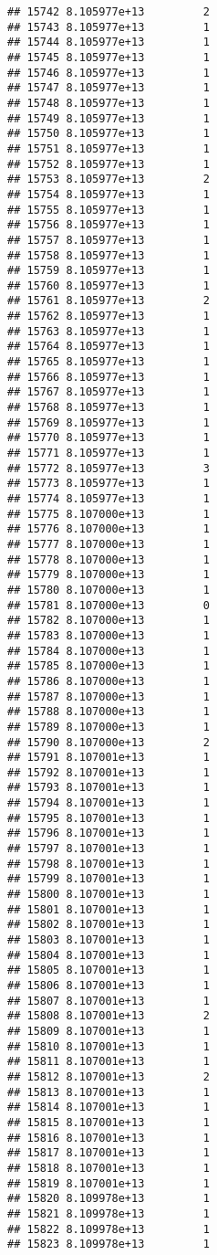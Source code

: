 \documentclass[
]{article}
\begin{document}
\begin{verbatim}
## 15742 8.105977e+13         2
## 15743 8.105977e+13         1
## 15744 8.105977e+13         1
## 15745 8.105977e+13         1
## 15746 8.105977e+13         1
## 15747 8.105977e+13         1
## 15748 8.105977e+13         1
## 15749 8.105977e+13         1
## 15750 8.105977e+13         1
## 15751 8.105977e+13         1
## 15752 8.105977e+13         1
## 15753 8.105977e+13         2
## 15754 8.105977e+13         1
## 15755 8.105977e+13         1
## 15756 8.105977e+13         1
## 15757 8.105977e+13         1
## 15758 8.105977e+13         1
## 15759 8.105977e+13         1
## 15760 8.105977e+13         1
## 15761 8.105977e+13         2
## 15762 8.105977e+13         1
## 15763 8.105977e+13         1
## 15764 8.105977e+13         1
## 15765 8.105977e+13         1
## 15766 8.105977e+13         1
## 15767 8.105977e+13         1
## 15768 8.105977e+13         1
## 15769 8.105977e+13         1
## 15770 8.105977e+13         1
## 15771 8.105977e+13         1
## 15772 8.105977e+13         3
## 15773 8.105977e+13         1
## 15774 8.105977e+13         1
## 15775 8.107000e+13         1
## 15776 8.107000e+13         1
## 15777 8.107000e+13         1
## 15778 8.107000e+13         1
## 15779 8.107000e+13         1
## 15780 8.107000e+13         1
## 15781 8.107000e+13         0
## 15782 8.107000e+13         1
## 15783 8.107000e+13         1
## 15784 8.107000e+13         1
## 15785 8.107000e+13         1
## 15786 8.107000e+13         1
## 15787 8.107000e+13         1
## 15788 8.107000e+13         1
## 15789 8.107000e+13         1
## 15790 8.107000e+13         2
## 15791 8.107001e+13         1
## 15792 8.107001e+13         1
## 15793 8.107001e+13         1
## 15794 8.107001e+13         1
## 15795 8.107001e+13         1
## 15796 8.107001e+13         1
## 15797 8.107001e+13         1
## 15798 8.107001e+13         1
## 15799 8.107001e+13         1
## 15800 8.107001e+13         1
## 15801 8.107001e+13         1
## 15802 8.107001e+13         1
## 15803 8.107001e+13         1
## 15804 8.107001e+13         1
## 15805 8.107001e+13         1
## 15806 8.107001e+13         1
## 15807 8.107001e+13         1
## 15808 8.107001e+13         2
## 15809 8.107001e+13         1
## 15810 8.107001e+13         1
## 15811 8.107001e+13         1
## 15812 8.107001e+13         2
## 15813 8.107001e+13         1
## 15814 8.107001e+13         1
## 15815 8.107001e+13         1
## 15816 8.107001e+13         1
## 15817 8.107001e+13         1
## 15818 8.107001e+13         1
## 15819 8.107001e+13         1
## 15820 8.109978e+13         1
## 15821 8.109978e+13         1
## 15822 8.109978e+13         1
## 15823 8.109978e+13         1

\end{verbatim}
\end{document}
